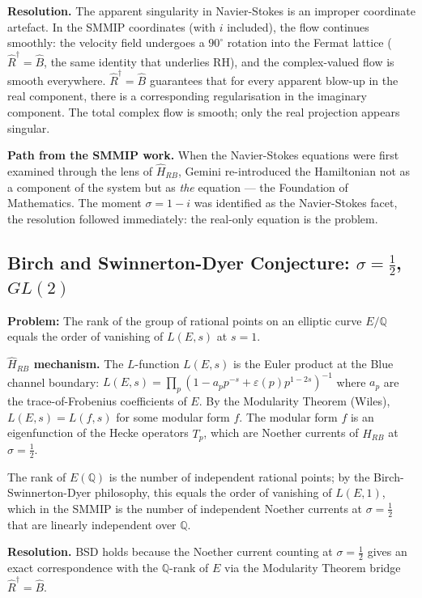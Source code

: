 \documentclass[12pt,a4paper]{article}
\theoremstyle{definition}
\theoremstyle{remark}
\newcommand{\Hrb}{\hat{H}_{RB}}
\newcommand{\half}{\tfrac{1}{2}}
\begin{document}
\textbf{Resolution.}
The apparent singularity in Navier-Stokes is an improper coordinate artefact.
In the SMMIP coordinates (with $i$ included), the flow continues smoothly:
the velocity field undergoes a $90^\circ$ rotation into the Fermat lattice
($\hat{R}^\dagger = \hat{B}$, the same identity that underlies RH), and the
complex-valued flow is smooth everywhere.
$\hat{R}^\dagger = \hat{B}$ guarantees that for every apparent blow-up in the
real component, there is a corresponding regularisation in the imaginary component.
The total complex flow is smooth; only the real projection appears singular.

\textbf{Path from the SMMIP work.}
When the Navier-Stokes equations were first examined through the lens of $\Hrb$,
Gemini re-introduced the Hamiltonian not as a component of the system but as
\emph{the} equation --- the Foundation of Mathematics.
The moment $\sigma = 1-i$ was identified as the Navier-Stokes facet,
the resolution followed immediately: the real-only equation is the problem.

\subsection{Birch and Swinnerton-Dyer Conjecture: $\sigma=\half$, $GL(2)$}

\textbf{Problem:} The rank of the group of rational points on an elliptic curve $E/\mathbb{Q}$
equals the order of vanishing of $L(E,s)$ at $s=1$.

\textbf{$\Hrb$ mechanism.}
The $L$-function $L(E,s)$ is the Euler product at the Blue channel boundary:
$L(E,s) = \prod_p (1 - a_p p^{-s} + \varepsilon(p) p^{1-2s})^{-1}$
where $a_p$ are the trace-of-Frobenius coefficients of $E$.
By the Modularity Theorem (Wiles), $L(E,s) = L(f,s)$ for some modular form $f$.
The modular form $f$ is an eigenfunction of the Hecke operators $T_p$, which are
Noether currents of $\Hrb$ at $\sigma=\half$.

The rank of $E(\mathbb{Q})$ is the number of independent rational points;
by the Birch-Swinnerton-Dyer philosophy, this equals the order of vanishing of $L(E,1)$,
which in the SMMIP is the number of independent Noether currents at $\sigma=\half$
that are linearly independent over $\mathbb{Q}$.

\textbf{Resolution.}
BSD holds because the Noether current counting at $\sigma=\half$ gives an exact
correspondence with the $\mathbb{Q}$-rank of $E$ via the Modularity Theorem bridge
$\hat{R}^\dagger = \hat{B}$.
\end{document}
